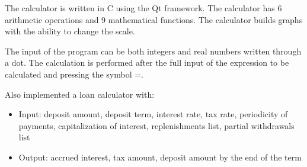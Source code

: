 \documentclass{article}
\def\header#1#2{\par\vspace{11pt}{\ifcase#1\or\huge\or\Large\or\large\or\normalsize\or\small\fi \bfseries #2}\vspace{11pt}\par}
\begin{document}
\header2{Documentation for SmartCalc-v1.0}

The calculator is written in C using the Qt framework. The calculator has 6 arithmetic operations and 9 mathematical functions. The calculator builds graphs with the ability to change the scale.

The input of the program can be both integers and real numbers written through a dot. The calculation is performed after the full input of the expression to be calculated and pressing the symbol =. 

Also implemented a loan calculator with:

\begin{itemize}
\item Input: deposit amount, deposit term, interest rate, tax rate, periodicity of payments, capitalization of interest, replenishments list, partial withdrawals list
\end{itemize}

\begin{itemize}
\item Output: accrued interest, tax amount, deposit amount by the end of the term
\end{itemize}
\end{document}
